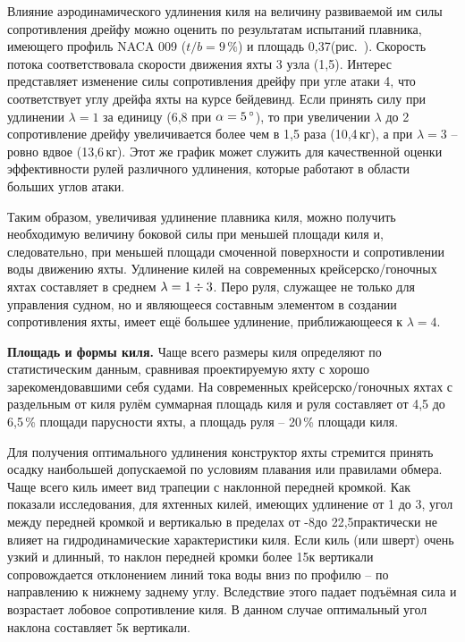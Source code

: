 Влияние аэродинамического удлинения киля на величину развиваемой им
силы сопротивления дрейфу  можно оценить по результатам
испытаний плавника, имеющего профиль NACA 009 ($t/b = 9\,\%$) и
площадь 0,37\msq (рис.~). Скорость потока соответствовала
скорости движения яхты 3 узла (1,5\speedms). Интерес представляет
изменение силы сопротивления дрейфу при угле атаки 4\gr, что
соответствует углу дрейфа яхты на курсе бейдевинд. Если принять силу
 при удлинении $\lambda = 1$ за единицу (6,8 при
$\alpha = 5\,^\circ$), то при увеличении $\lambda$ до 2 сопротивление
дрейфу увеличивается более чем в 1,5 раза (10,4\,кг), а при
$\lambda = 3$ \--- ровно вдвое (13,6\,кг). Этот же график может
служить для качественной оценки эффективности рулей различного
удлинения, которые работают в области больших углов атаки.

Таким образом, увеличивая удлинение плавника киля, можно получить
необходимую величину боковой силы  при меньшей площади киля
и, следовательно, при меньшей площади смоченной поверхности и
сопротивлении воды движению яхты. Удлинение килей на современных
крейсерско\-/гоночных яхтах составляет в среднем
$\lambda = 1 \div 3$. Перо руля, служащее не только для управления
судном, но и являющееся составным элементом в создании сопротивления
яхты, имеет ещё большее удлинение, приближающееся к $\lambda = 4$.

\textbf{Площадь и формы киля.} Чаще всего размеры киля определяют по
статистическим данным, сравнивая проектируемую яхту с хорошо
зарекомендовавшими себя судами. На современных крейсерско\-/гоночных
яхтах с раздельным от киля рулём суммарная площадь киля и руля
составляет от 4,5 до 6,5\,\% площади парусности яхты, а площадь руля
\--- 20\,\% площади киля.

Для получения оптимального удлинения конструктор яхты стремится
принять осадку наибольшей допускаемой по условиям плавания или
правилами обмера. Чаще всего киль имеет вид трапеции с наклонной
передней кромкой. Как показали исследования, для яхтенных килей,
имеющих удлинение от 1 до 3, угол между передней кромкой и вертикалью
в пределах от -8\gr до 22,5\gr практически не влияет на
гидродинамические характеристики киля. Если киль (или шверт) очень
узкий и длинный, то наклон передней кромки более 15\gr к вертикали
сопровождается отклонением линий тока воды вниз по профилю \--- по
направлению к нижнему заднему углу. Вследствие этого падает подъёмная
сила и возрастает лобовое сопротивление киля. В данном случае
оптимальный угол наклона составляет 5\gr к вертикали.

